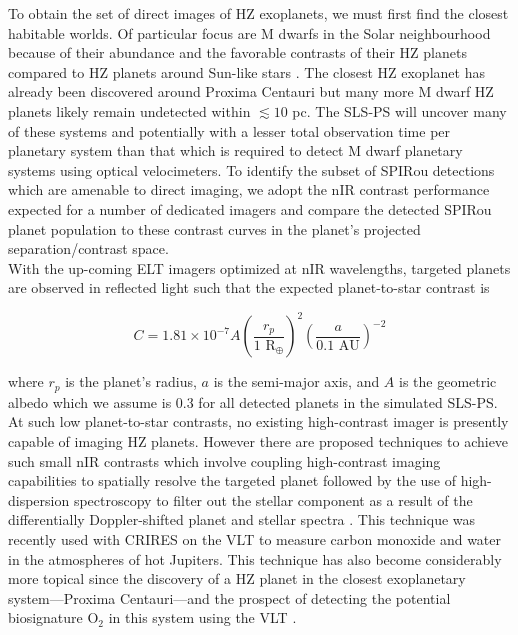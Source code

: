 To obtain the set of direct images of HZ exoplanets, we must first find the closest habitable
worlds. Of particular focus are M dwarfs in the Solar neighbourhood because of their abundance and the
favorable contrasts of their HZ planets compared to HZ planets around Sun-like stars \citep{crossfield13}. 
The closest HZ exoplanet has already been discovered around Proxima Centauri
\citep[1.3 pc;][]{angladaescude16} but many more M dwarf HZ planets likely remain undetected
within $\lesssim 10$ pc. The SLS-PS will uncover many of these systems and potentially with a lesser total
observation time per planetary system than that which is required to detect M dwarf planetary systems
using optical velocimeters. To identify the subset of SPIRou
detections which are amenable to direct imaging, we adopt the nIR contrast performance expected for
a number of dedicated imagers and compare the detected SPIRou planet population to these contrast curves
in the planet's projected separation/contrast space. \\

With the up-coming ELT imagers optimized at nIR wavelengths, targeted planets are observed in
reflected light such that the expected planet-to-star contrast is

\begin{equation}
  C = 1.81 \times 10^{-7} A \left( \frac{r_p}{1\text{ R}_{\oplus}} \right)^2
  \left( \frac{a}{0.1\text{ AU}} \right)^{-2}
\end{equation}

\noindent where $r_p$ is the planet's radius, $a$ is the semi-major axis, and
$A$ is the geometric albedo which we assume is 0.3 for all
detected planets in the simulated SLS-PS. At such low planet-to-star contrasts, no existing
high-contrast imager is presently capable of imaging HZ planets. However there are
proposed techniques to achieve such small nIR contrasts which involve
coupling high-contrast imaging capabilities to spatially resolve the targeted planet followed
by the use of 
high-dispersion spectroscopy to filter out the stellar component as a result of the differentially
Doppler-shifted planet and stellar spectra \citep[e.g.][]{snellen15, lovis17}. This technique was
recently used with CRIRES on the VLT to measure carbon monoxide \citep{snellen10, brogi12, dekok13}
and water \citep{birkby13} in the atmospheres of hot Jupiters. This technique has also
become considerably more topical since the discovery of a HZ planet in the closest exoplanetary
system---Proxima Centauri---and the prospect of detecting the potential biosignature O$_2$ in this
system using the VLT \citep{lovis17}. \\

